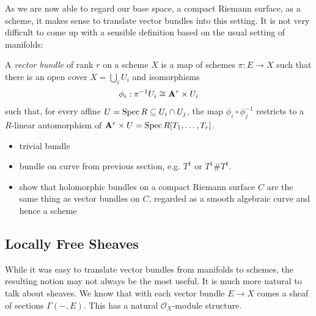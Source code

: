 \documentclass[12pt]{ociamthesis}  %
\begin{document}
As we are now able to regard our base space, a compact Riemann
surface, as a scheme, it makes sense to translate vector bundles
into this setting. It is not very difficult to come up with a
sensible definition based on the usual setting of manifolds:

\begin{definition}
  \label{def:vector_bundle}
  A \emph{vector bundle} of rank $r$ on a scheme $X$ is
  a map of schemes $\pi : E \to X$ such that there is an open
  cover $X = \bigcup_i U_i$ and isomorphisms
  \begin{align}\label{eq:trivialisation}
    \phi_i : {\pi}^{-1}U_i \cong \mathbf{A}^{r}_{}\times U_i
  \end{align}
  such that, for every affine $U = \operatorname{Spec} R \subseteq U_i \cap U_j$,
  the map $\phi_i \circ \phi^{-1}_j$ restricts to a $R$-linear
  automorphism of $\mathbf{A}^{r}_{}\times U = \operatorname{Spec} R[T_1,\ldots,T_r]$.
\end{definition}

\begin{example}
  \begin{itemize}
    \item trivial bundle
    \item bundle on curve from previous section, e.g. $T^1$ or
          $T^1 \# T^1$.
  \end{itemize}
\end{example}

\begin{itemize}
  \item show that holomorphic bundles on a compact Riemann surface $C$
        are the same thing as vector bundles on $C$, regarded as a smooth algebraic curve and hence a scheme
\end{itemize}

\missingsection

\subsection{Locally Free Sheaves}\label{sec:locally_free_sheaves}

While it was easy to translate vector bundles from manifolds
to schemes, the resulting notion may not always be the most
useful. It is much more natural to talk about sheaves. We know
that with each vector bundle $E\to X$ comes a sheaf of sections
$\Gamma(-,E)$. This has a natural $\mathscr O_X$-module structure.
\end{document}
